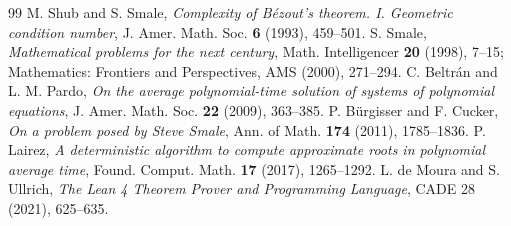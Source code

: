 \documentclass[11pt,a4paper]{article}
\theoremstyle{definition}
\begin{document}
\begin{thebibliography}{99}
 M. Shub and S. Smale, \textit{Complexity of Bézout's theorem. I. Geometric condition number}, J. Amer. Math. Soc. \textbf{6} (1993), 459--501.
 S. Smale, \textit{Mathematical problems for the next century}, Math. Intelligencer \textbf{20} (1998), 7--15; Mathematics: Frontiers and Perspectives, AMS (2000), 271--294.
 C. Beltrán and L. M. Pardo, \textit{On the average polynomial-time solution of systems of polynomial equations}, J. Amer. Math. Soc. \textbf{22} (2009), 363--385.
 P. Bürgisser and F. Cucker, \textit{On a problem posed by Steve Smale}, Ann. of Math. \textbf{174} (2011), 1785--1836.
 P. Lairez, \textit{A deterministic algorithm to compute approximate roots in polynomial average time}, Found. Comput. Math. \textbf{17} (2017), 1265--1292.
 L. de Moura and S. Ullrich, \textit{The Lean 4 Theorem Prover and Programming Language}, CADE 28 (2021), 625--635.
\end{thebibliography}
\end{document}
